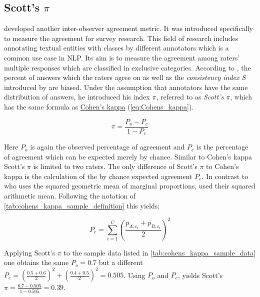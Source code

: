 \subsection[Scott's Pi]{Scott's $\pi$}
\label{chp:fundamentals:sec:inter_rater_agreement:subsec:scotts_pi}
\textcite{Scott:1955} developed another inter-observer agreement metric.
It was introduced specifically to measure the agreement for survey research.
This field of research includes annotating textual entities with classes by different annotators which is a common use case in \ac{NLP}.
Its aim is to measure the agreement among raters' multiple responses which are classified in exclusive categories.
According to \textcite{Scott:1955}, the percent of answers which the raters agree on as well as the \textit{consistency index S} introduced by \textcite{Bennett:1954} are biased.
Under the assumption that annotators have the same distribution of answers, he introduced his index $\pi$, referred to as \textit{Scott's $\pi$}, which has the same formula as \hyperref[chp:fundamentals:sec:inter_rater_agreement:subsec:cohens_kappa]{Cohen's kappa} (\cref{eq:Cohens_kappa}).

\begin{equation}\label{eq:Scotts_pi}
    \pi = \frac{P_o - P_e}{1 - P_e}
\end{equation}

Here $P_o$ is again the observed percentage of agreement and $P_e$ is the percentage of agreement which can be expected merely by chance.
Similar to Cohen's kappa Scott's $\pi$ is limited to two raters.
The only difference of Scott's $\pi$ to Cohen's kappa is the calculation of the by chance expected agreement $P_e$.
In contrast to \textcite{Cohen:1960} who uses the squared geometric mean of marginal proportions, \textcite{Scott:1955} used their squared arithmetic mean.
Following the notation of \cref{tab:cohens_kappa_sample_definition} this yields:

\begin{equation}\label{eq:Scotts_pi:p_e}
    P_e = \sum_{i=1}^{C} (\frac{p_{A, c_i} + p_{B, c_i}}{2})^2
\end{equation}

Applying Scott's $\pi$ to the sample data listed in \cref{tab:cohens_kappa_sample_data} one obtains the same $P_o=0.7$ but a different $P_e = (\frac{0.5 + 0.6}{2})^2 + (\frac{0.4+0.5}{2})^2 = 0.505$.
Using $P_o$ and $P_e$, yields Scott's $\pi = \frac{0.7 - 0.505}{1-0.505} = 0.\overline{39}$.
